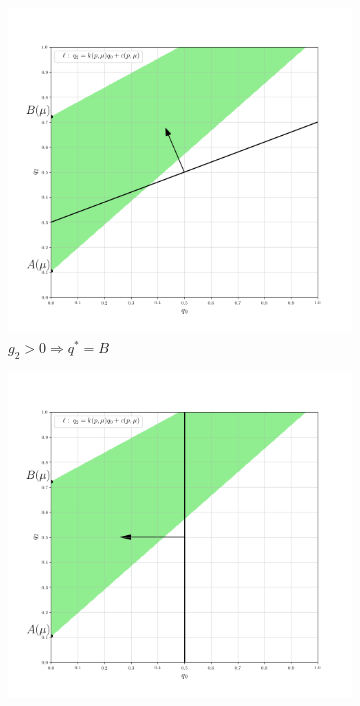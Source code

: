 \begin{flushleft}
	\begin{figure}[H]
    	\centering
     	\begin{subfigure}[b]{0.3 \textwidth}
        	\centering
        	\includegraphics[width=\textwidth]{images/graf_3_7_0}
        	\caption{$g_2 > 0 \Rightarrow q^*=B$}
         	\label{fig:y equals x}
     	\end{subfigure}
     	\begin{subfigure}[b]{0.3 \textwidth}
        	\centering
        	\includegraphics[width=\textwidth]{images/graf_3_7_1}

\end{subfigure}
\end{figure}
\end{flushleft}

